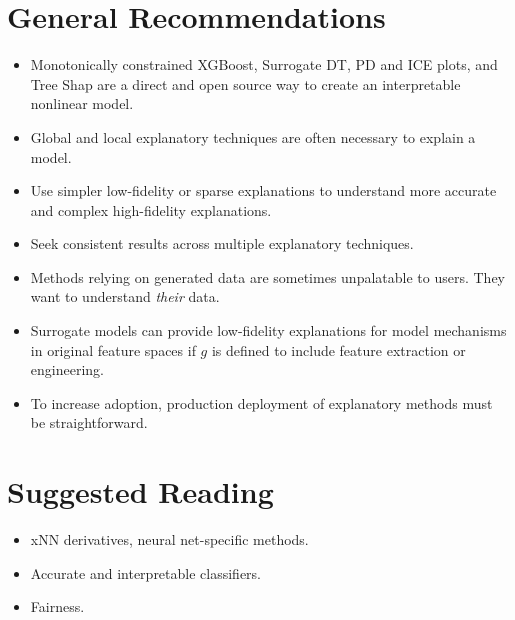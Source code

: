 \documentclass{article}
\begin{document}
\section{General Recommendations} \label{sec:gen_rec}

\begin{itemize}
	
	\item Monotonically constrained XGBoost, Surrogate DT, PD and ICE plots, and Tree Shap are a direct and open source way to create an interpretable nonlinear model.
	
	\item Global and local explanatory techniques are often necessary to explain a model.
	
	\item Use simpler low-fidelity or sparse explanations to understand more accurate and complex high-fidelity explanations.  
	
	\item Seek consistent results across multiple explanatory techniques. 
	
	\item Methods relying on generated data are sometimes unpalatable to users. They want to understand \textit{their} data.
	
	\item Surrogate models can provide low-fidelity explanations for model mechanisms in original feature spaces if $g$ is defined to include feature extraction or engineering.
	
	\item To increase adoption, production deployment of explanatory methods must be straightforward.
	
\end{itemize}

\section{Suggested Reading} \label{sec:suggested}

\begin{itemize}
\item xNN derivatives, neural net-specific methods.
\item Accurate and interpretable classifiers.
\item Fairness.
\end{itemize} 
\end{document}
